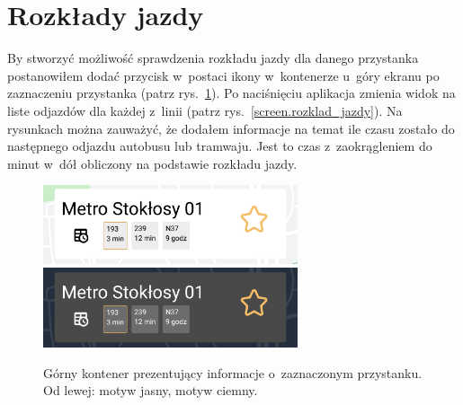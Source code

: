 \documentclass{SGGW-thesis}
\begin{document}
\section{Rozkłady jazdy}
By stworzyć możliwość sprawdzenia rozkładu jazdy dla danego przystanka postanowiłem dodać przycisk w~postaci ikony w~kontenerze u~góry ekranu po zaznaczeniu przystanka (patrz rys.~\ref{screen.topbox}).
Po naciśnięciu aplikacja zmienia widok na liste odjazdów dla każdej z~linii (patrz rys.~\ref{screen.rozklad_jazdy}).
Na rysunkach można zauważyć, że dodałem informacje na temat ile czasu zostało do następnego odjazdu autobusu lub tramwaju.
Jest to czas z~zaokrągleniem do minut w~dół obliczony na podstawie rozkładu jazdy.
\begin{figure}[!htb]
  \centering
  \includegraphics[width=75mm]{screeny/topbox_jasny}
  \enspace
  \includegraphics[width=75mm]{screeny/topbox_ciemny}
  \caption[Górny kontener]{
    \label{screen.topbox}
    Górny kontener prezentujący informacje o~zaznaczonym przystanku. Od lewej: motyw jasny, motyw ciemny. \vspace{2ex}
  }
\end{figure}
\end{document}
